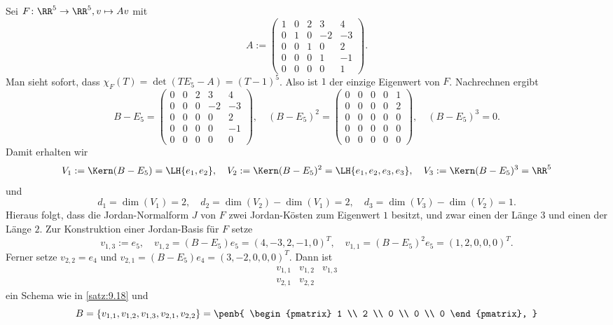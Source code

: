\begin{beispiel}
	\label{bsp:9.20}
	Sei $F\colon \RR^5 \rightarrow \RR^5, v \mapsto Av$ mit
	\[
		A := \begin{pmatrix}
			1 & 0 & 2 & 3 & 4 \\
			0 & 1 & 0 & -2 & -3 \\
			0 & 0 & 1 & 0 & 2 \\
			0 & 0 & 0 & 1 & -1 \\
			0 & 0 & 0 & 0 & 1
		\end{pmatrix}.
	\]
	Man sieht sofort, dass $\chi_F(T) = \det(TE_5-A) = (T-1)^5$.
	Also ist $1$ der einzige Eigenwert von $F$.
	Nachrechnen ergibt
	\[
		B - E_5 = \begin{pmatrix}
		0 & 0 & 2 & 3 & 4 \\
		0 & 0 & 0 & -2 & -3 \\
		0 & 0 & 0 & 0 & 2 \\
		0 & 0 & 0 & 0 & -1 \\
		0 & 0 & 0 & 0 & 0
		\end{pmatrix}, \quad (B-E_5)^2 = \begin{pmatrix}
		0 & 0 & 0 & 0 & 1 \\
		0 & 0 & 0 & 0 & 2 \\
		0 & 0 & 0 & 0 & 0 \\
		0 & 0 & 0 & 0 & 0 \\
		0 & 0 & 0 & 0 & 0
		\end{pmatrix}, \quad (B-E_5)^3 = 0.
	\]
	Damit erhalten wir
	\[
		V_1 := \Kern(B-E_5) = \LH\{e_1,e_2\}, \quad V_2 := \Kern(B-E_5)^2 = \LH\{e_1,e_2,e_3,e_3\}, \quad V_3 := \Kern(B-E_5)^3 = \RR^5
	\]
	und
	\[
		d_1 = \dim(V_1) = 2,  \quad d_2 = \dim(V_2) - \dim(V_1) = 2, \quad d_3 = \dim(V_3) - \dim(V_2) = 1.
	\]
	Hieraus folgt, dass die Jordan-Normalform $J$ von $F$ zwei Jordan-Kösten zum Eigenwert $1$ besitzt, und zwar einen der Länge $3$ und einen der Länge $2$.
	Zur Konstruktion einer Jordan-Basis für $F$ setze
	\[
		v_{1,3} := e_5, \quad v_{1,2} = (B-E_5)e_5 = (4,-3,2,-1,0)^T, \quad v_{1,1} = (B-E_5)^2 e_5 = (1,2,0,0,0)^T.
	\]
	Ferner setze $v_{2,2} = e_4$ und $v_{2,1} = (B-E_5)e_4 = (3,-2,0,0,0)^T$.
	Dann ist
	\[
		\begin{array}{ccc}
			v_{1,1} & v_{1,2} & v_{1,3} \\
			v_{2,1} & v_{2,2}
		\end{array}
	\]
	ein Schema wie in \autoref{satz:9.18} und
	\[
		B = \{v_{1,1},v_{1,2},v_{1,3},v_{2,1},v_{2,2}\} = \penb{
			\begin{pmatrix} 1 \\ 2 \\ 0 \\ 0 \\ 0 \end{pmatrix},
}\]
\end{beispiel}
